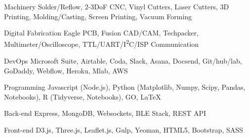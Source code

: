

\begin{cvskills}

  \cvskill
    {Machinery} %
    {Solder/Reflow, 2-3DoF CNC, Vinyl Cutters, Laser Cutters, 3D Printing, Molding/Casting, Screen Printing, Vacuum Forming} %

  \cvskill
    {Digital Fabrication} %
    {Eagle PCB, Fusion CAD/CAM, Techpacker, Multimeter/Oscilloscope, TTL/UART/I\textsuperscript{2}C/ISP Communication} %

  \cvskill
    {DevOps} %
    {Microsoft Suite, Airtable, Coda, Slack, Asana, Docsend, Git/hub/lab, GoDaddy, Webflow, Heroku, Mlab, AWS} %

  \cvskill
    {Programming} %
    {Javascript (Node.js), Python (Matplotlib, Numpy, Scipy, Pandas, Notebooks), R (Tidyverse, Notebooks), GO, LaTeX} %

  \cvskill
    {Back-end} %
    {Express, MongoDB, Websockets, BLE Stack, REST API} %

  \cvskill
    {Front-end} %
    {D3.js, Three.js, Leaflet.js, Gulp, Yeoman, HTML5, Bootstrap, SASS} %

\end{cvskills}
